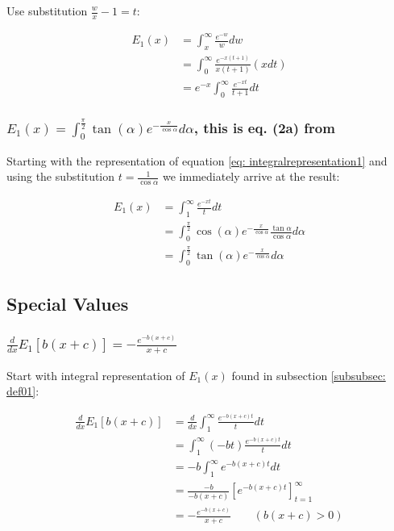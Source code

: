 \documentclass[bibliography=totocnumbered]{scrartcl}
\begin{document}
	Use substitution $\frac{w}{x}-1=t$:

	\begin{align}
		E_1\left(x\right)&=\int_{x}^{\infty}\frac{e^{-w}}{w}dw\\
		&=\int_{0}^{\infty}\frac{e^{-x\left(t+1\right)}}{x\left(t+1\right)}\left(xdt\right)\\
		&=e^{-x}\int_{0}^{\infty}\frac{e^{-xt}}{t+1}dt
	\end{align}

	\subsubsection[A integral representation involving integration over an angle]{$E_1\left(x\right)=\int_{0}^{\frac{\pi}{2}}\tan{\left(\alpha\right)}e^{-\frac{x}{\cos{\alpha}}}d\alpha$, this is eq. (2a) from \cite{boer1990calc}}
	\label{subsubsec: integralRep_angle}

	Starting with the representation of equation \eqref{eq: integralrepresentation1} and using the substitution $t=\frac{1}{\cos\alpha}$ we immediately arrive at the result:

	\begin{align}
		E_1\left(x\right)&=\int_{1}^{\infty}\frac{e^{-xt}}{t}dt\\
		&=\int_{0}^{\frac{\pi}{2}}\cos{\left(\alpha\right)}e^{-\frac{x}{\cos\alpha}}\frac{\tan\alpha}{\cos\alpha}d\alpha\\
		&=\int_{0}^{\frac{\pi}{2}}\tan{\left(\alpha\right)}e^{-\frac{x}{\cos{\alpha}}}d\alpha
	\end{align}

	\subsection{Special Values}

	\subsubsection[A derivative of E1(x)]{$\frac{d}{dx}E_1\left[b\left(x+c\right)\right]=-\frac{e^{-b\left(x+c\right)}}{x+c}$}
	\label{subsubsec: specval_deriv}

	Start with integral representation of $E_1\left(x\right)$ found in subsection \ref{subsubsec: def01}:

	\begin{align}
		\frac{d}{dx}E_1\left[b\left(x+c\right)\right]&=\frac{d}{dx}\int_{1}^{\infty}\frac{e^{-b\left(x+c\right)t}}{t}dt\\
		&=\int_{1}^{\infty}\left(-bt\right)\frac{e^{-b\left(x+c\right)t}}{t}dt\\
		&=-b\int_{1}^{\infty}e^{-b\left(x+c\right)t}dt\\
		&=\frac{-b}{-b\left(x+c\right)}\left[e^{-b\left(x+c\right)t}\right]^{\infty}_{t=1}\\
		&=-\frac{e^{-b\left(x+c\right)}}{x+c}\qquad\left(b\left(x+c\right)>0\right)
	\end{align}
\end{document}
